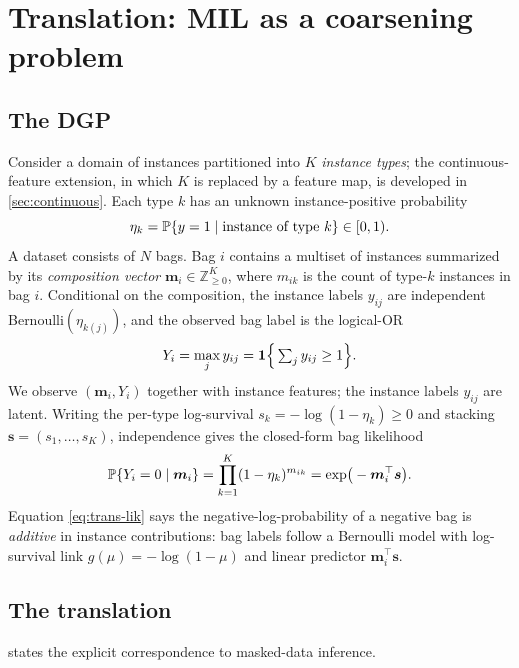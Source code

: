 \section{Translation: MIL as a coarsening problem}
\label{sec:translation}

\subsection{The DGP}

Consider a domain of instances partitioned into $K$ \emph{instance
types}; the continuous-feature extension, in which $K$ is replaced
by a feature map, is developed in \cref{sec:continuous}. Each type
$k$ has an unknown instance-positive probability
\begin{equation}
  \eta_k = \mathbb{P}\{y = 1 \mid \text{instance of type } k\}
  \in [0,1).
  \label{eq:trans-eta}
\end{equation}
A dataset consists of $N$ bags. Bag $i$ contains a multiset of
instances summarized by its \emph{composition vector}
$\bm{m}_i \in \mathbb{Z}_{\geq 0}^K$, where $m_{ik}$ is the count of
type-$k$ instances in bag $i$. Conditional on the composition, the
instance labels $y_{ij}$ are independent Bernoulli$(\eta_{k(j)})$,
and the observed bag label is the logical-OR
\begin{equation}
  Y_i = \max_j y_{ij}
  = \mathbf{1}\Big\{ \textstyle\sum_j y_{ij} \geq 1 \Big\}.
  \label{eq:trans-or}
\end{equation}
We observe $(\bm{m}_i, Y_i)$ together with instance features; the
instance labels $y_{ij}$ are latent. Writing the per-type
log-survival $s_k = -\log(1 - \eta_k) \geq 0$ and stacking
$\bm{s} = (s_1,\ldots,s_K)$, independence gives the closed-form bag
likelihood
\begin{equation}
  \mathbb{P}\{Y_i = 0 \mid \bm{m}_i\}
  = \prod_{k=1}^K (1 - \eta_k)^{m_{ik}}
  = \exp\!\big(-\bm{m}_i^\top \bm{s}\big).
  \label{eq:trans-lik}
\end{equation}
Equation \eqref{eq:trans-lik} says the negative-log-probability of a
negative bag is \emph{additive} in instance contributions: bag
labels follow a Bernoulli model with log-survival link
$g(\mu) = -\log(1-\mu)$ and
linear predictor $\bm{m}_i^\top \bm{s}$.

\subsection{The translation}

 states the explicit correspondence to
masked-data inference.

